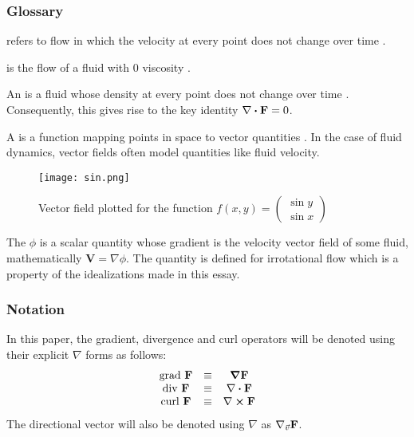 \subsubsection{Glossary}
\begin{defn} %
     refers to flow in which the velocity at every point does not change over time \cite{CRACIUNOIU2001559}.
\end{defn}
\begin{defn} %
     is the flow of a fluid with 0 viscosity \cite{ANDERSON20031}.
\end{defn}
\begin{defn} %
    An  is a fluid whose density at every point does not change over time \cite{AHMED2019331}. Consequently, this gives rise to the key identity $\div\fatf=0$.
\end{defn}
\begin{defn} %
    A  is a function mapping points in space to vector quantities \cite{BREZINSKI20063}. In the case of fluid dynamics, vector fields often model quantities like fluid velocity.

	\begin{figure*}[!ht]
		\texttt{[image: sin.png]}
		\centering
		\caption{Vector field plotted for the function $f(x,y)=\begin{pmatrix}
			\sin y\\\sin x
		\end{pmatrix}$}
	\end{figure*}
\end{defn}
\begin{defn} %
	The  $\phi$ is a scalar quantity whose gradient is the velocity vector field of some fluid, mathematically $\mathbf{V}=\nabla\phi$. The quantity is defined for irrotational flow which is a property of the idealizations made in this essay.
\end{defn}

\subsubsection{Notation}
In this paper, the gradient, divergence and curl operators will be denoted using their explicit $\nabla$ forms as follows:
$$\begin{matrix}
	\mathrm{grad}\ \fatf&\equiv&\grad{\fatf}\\
	\mathrm{div}\ \fatf&\equiv&\divergence\fatf\\
	\mathrm{curl}\ \fatf&\equiv&\curl\fatf
\end{matrix}$$
The directional vector will also be denoted using $\nabla$ as $\nabla_{\vec{v}}\mathbf{F}$.

